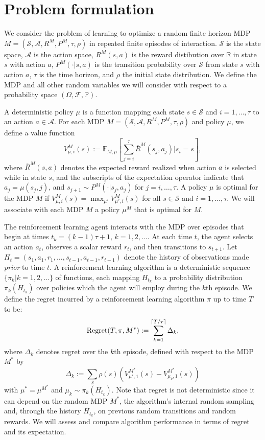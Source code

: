\documentclass{article}
\newcommand{\Exp}{\mathds{E}}
\newcommand{\Real}{\mathds{R}}
\newcommand{\Sc}{\mathcal{S}}
\newcommand{\Ac}{\mathcal{A}}
\begin{document}
\section{Problem formulation}

We consider the problem of learning to optimize a random finite horizon MDP $M = (\Sc, \Ac, R^M, P^M, \tau, \rho)$ in repeated finite episodes of interaction.
$\mathcal{S}$ is the state space, $\mathcal{A}$ is the action space, $R^M(s,a)$ is the reward distibution over $\Real$ in state $s$ with action $a$, $P^M(\cdot|s,a)$ is the transition probability over $\Sc$ from state $s$ with action $a$, $\tau$ is the time horizon, and $\rho$ the initial state distribution.
We define the MDP and all other random variables we will consider with respect to a probability space $(\Omega, \mathcal{F}, \mathbb{P})$.

A deterministic policy $\mu$ is a function mapping each state $s \in \Sc$ and $i = 1,\ldots,\tau$ to an action $a \in \Ac$.
For each MDP $M = (\mathcal{S}, \mathcal{A}, R^M, P^M, \tau, \rho)$ and policy $\mu$, we define a value function
$$V^{M}_{\mu, i}(s) := \Exp_{M,\mu}\left[ \sum_{j=i}^{\tau} \overline{R}^M(s_j,a_j) \Big| s_i = s \right],$$
where $\overline{R}^M(s,a)$ denotes the expected reward realized when action $a$ is selected while in state $s$, and the subscripts of the expectation operator indicate that $a_j = \mu(s_j, j)$, and $s_{j+1} \sim P^M(\cdot| s_j, a_j)$ for $j = i, \ldots, \tau$.
A policy $\mu$ is optimal for the MDP $M$ if $V^{M}_{\mu, i}(s) = \max_{\mu'} V^{M}_{\mu', i}(s)$ for all $s \in \Sc$ and $i=1,\ldots,\tau$. We will associate with each MDP $M$ a policy $\mu^M$ that is optimal for $M$.

The reinforcement learning agent interacts with the MDP over episodes that begin at times $t_k = (k-1) \tau + 1$, $k=1,2,\ldots$.
At each time $t$, the agent selects an action $a_t$, observes a scalar reward $r_t$, and then transitions to $s_{t+1}$.
Let $H_t = (s_1,a_1,r_1,\ldots,s_{t-1},a_{t-1},r_{t-1})$ denote the history of observations made \emph{prior} to time $t$.
A reinforcement learning algorithm is a deterministic sequence $\{\pi_k | k = 1, 2, \ldots\}$ of functions, each mapping $H_{t_k}$ to a probability distribution $\pi_{k}(H_{t_k})$ over policies which the agent will employ during the $k$th episode.
We define the regret incurred by a reinforcement learning algorithm $\pi$ up to time $T$ to be:
$${\rm Regret}(T, \pi, M^*) := \sum_{k=1}^{\lceil T/\tau \rceil} \Delta_k,$$
where $\Delta_k$ denotes regret over the $k$th episode, defined with respect to the MDP $M^*$ by
$$\Delta_k := \sum_{\Sc} \rho(s) (V^{M^*}_{\mu^*, 1}(s) - V^{M^{*}}_{\mu_k, 1}(s))$$
with $\mu^* = \mu^{M^*}$ and $\mu_{k}\sim \pi_{k}(H_{t_k})$. Note that regret is not deterministic since it can depend on the random MDP $M^*$, the algorithm's internal random sampling and, through the history $H_{t_k}$, on previous random transitions and random rewards. We will assess and compare algorithm performance in terms of regret and its expectation.
\end{document}
